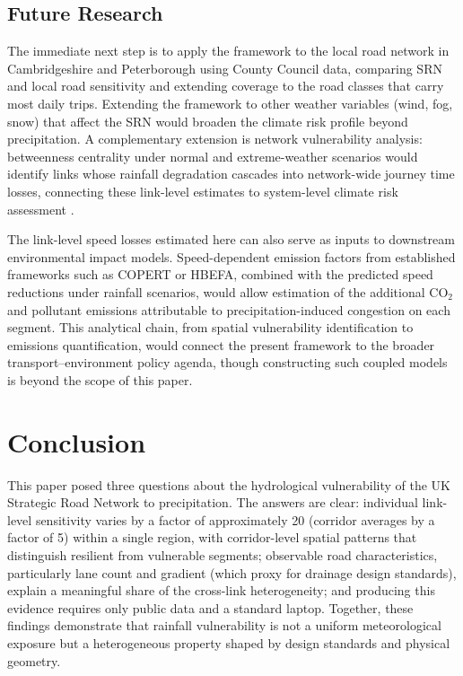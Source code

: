 \documentclass[review,authoryear]{elsarticle}
\begin{document}
\subsection{Future Research}
\label{sec:disc:future}

The immediate next step is to apply the framework to the local road network in Cambridgeshire and Peterborough using County Council data, comparing SRN and local road sensitivity and extending coverage to the road classes that carry most daily trips. Extending the framework to other weather variables (wind, fog, snow) that affect the SRN would broaden the climate risk profile beyond precipitation. A complementary extension is network vulnerability analysis: betweenness centrality under normal and extreme-weather scenarios would identify links whose rainfall degradation cascades into network-wide journey time losses, connecting these link-level estimates to system-level climate risk assessment \citep{ganin2017resilience}.

The link-level speed losses estimated here can also serve as inputs to downstream environmental impact models. Speed-dependent emission factors from established frameworks such as COPERT or HBEFA, combined with the predicted speed reductions under rainfall scenarios, would allow estimation of the additional CO$_2$ and pollutant emissions attributable to precipitation-induced congestion on each segment. This analytical chain, from spatial vulnerability identification to emissions quantification, would connect the present framework to the broader transport--environment policy agenda, though constructing such coupled models is beyond the scope of this paper.


\section{Conclusion}
\label{sec:conclusion}

This paper posed three questions about the hydrological vulnerability of the UK Strategic Road Network to precipitation. The answers are clear: individual link-level sensitivity varies by a factor of approximately 20 (corridor averages by a factor of 5) within a single region, with corridor-level spatial patterns that distinguish resilient from vulnerable segments; observable road characteristics, particularly lane count and gradient (which proxy for drainage design standards), explain a meaningful share of the cross-link heterogeneity; and producing this evidence requires only public data and a standard laptop. Together, these findings demonstrate that rainfall vulnerability is not a uniform meteorological exposure but a heterogeneous property shaped by design standards and physical geometry.
\end{document}
